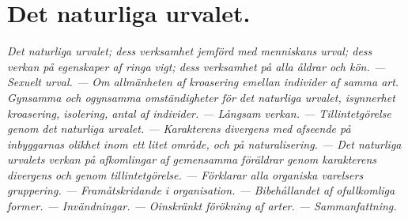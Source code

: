 

\chapter{Det naturliga urvalet.}
{\it
Det naturliga urvalet; dess verksamhet jemförd med menniskans urval; dess verkan på egenskaper af ringa vigt; dess verksamhet på alla åldrar och kön. — Sexuelt urval. — Om allmänheten af kroasering emellan individer af samma art. Gynsamma och ogynsamma omständigheter för det naturliga urvalet, isynnerhet kroasering, isolering, antal af individer. — Långsam verkan. — Tillintetgörelse genom det naturliga urvalet. — Karakterens divergens med afseende på inbyggarnas olikhet inom ett litet område, och på naturalisering. — Det naturliga urvalets verkan på afkomlingar af gemensamma föräldrar genom karakterens divergens och genom tillintetgörelse. — Förklarar alla organiska varelsers gruppering. — Framåtskridande i organisation. — Bibehållandet af ofullkomliga former. — Invändningar. — Oinskränkt förökning af arter. — Sammanfattning.
}

